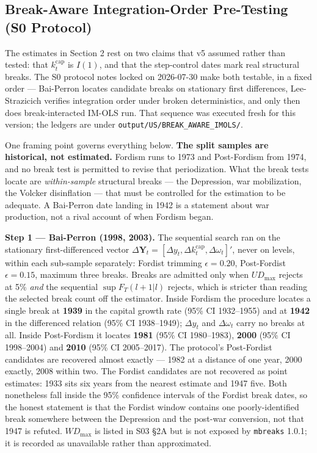 \documentclass[11pt,a4paper]{article}
\begin{document}
\FloatBarrier

\subsection{Break-Aware Integration-Order Pre-Testing (S0\* Protocol)}

The estimates in Section 2 rest on two claims that v5 assumed rather than tested: that $k_t^{\text{cap}}$ is $I(1)$, and that the step-control dates mark real structural breaks. The S0\* protocol notes locked on 2026-07-30 make both testable, in a fixed order --- Bai-Perron locates candidate breaks on stationary first differences, Lee-Strazicich verifies integration order under broken deterministics, and only then does break-interacted IM-OLS run. That sequence was executed fresh for this version; the ledgers are under \texttt{output/US/BREAK\_AWARE\_IMOLS/}.

One framing point governs everything below. \textbf{The split samples are historical, not estimated.} Fordism runs to 1973 and Post-Fordism from 1974, and no break test is permitted to revise that periodization. What the break tests locate are \textit{within-sample} structural breaks --- the Depression, war mobilization, the Volcker disinflation --- that must be controlled for the estimation to be adequate. A Bai-Perron date landing in 1942 is a statement about war production, not a rival account of when Fordism began.

\noindent\textbf{Step 1 --- Bai-Perron (1998, 2003).} The sequential search ran on the stationary first-differenced vector $\Delta\mathbf{Y}_t = [\Delta y_t, \Delta k_t^{\text{cap}}, \Delta\omega_t]'$, never on levels, within each sub-sample separately: Fordist trimming $\epsilon = 0.20$, Post-Fordist $\epsilon = 0.15$, maximum three breaks. Breaks are admitted only when $UD_{\max}$ rejects at 5\% \textit{and} the sequential $\sup F_T(l+1|l)$ rejects, which is stricter than reading the selected break count off the estimator. Inside Fordism the procedure locates a single break at \textbf{1939} in the capital growth rate (95\% CI 1932--1955) and at \textbf{1942} in the differenced relation (95\% CI 1938--1949); $\Delta y_t$ and $\Delta\omega_t$ carry no breaks at all. Inside Post-Fordism it locates \textbf{1981} (95\% CI 1980--1983), \textbf{2000} (95\% CI 1998--2004) and \textbf{2010} (95\% CI 2005--2017). The protocol's Post-Fordist candidates are recovered almost exactly --- 1982 at a distance of one year, 2000 exactly, 2008 within two. The Fordist candidates are not recovered as point estimates: 1933 sits six years from the nearest estimate and 1947 five. Both nonetheless fall inside the 95\% confidence intervals of the Fordist break dates, so the honest statement is that the Fordist window contains one poorly-identified break somewhere between the Depression and the post-war conversion, not that 1947 is refuted. $WD_{\max}$ is listed in S03 \S2A but is not exposed by \texttt{mbreaks} 1.0.1; it is recorded as unavailable rather than approximated.
\end{document}
